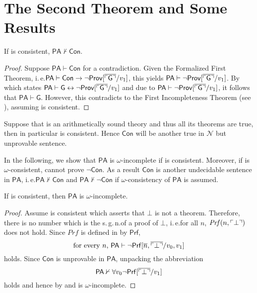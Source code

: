 \section{The Second Theorem and Some Results}

\begin{thm} \label{thm:secondPA}
If \PA is consistent, $\mathsf{PA} \nvdash \mathsf{Con}$.
\end{thm}
\begin{proof}
Suppose $\mathsf{PA} \vdash \mathsf{Con}$ for a contradiction. Given the Formalized First Theorem, i.\,e.\@ $\mathsf{PA} \vdash \mathsf{Con} \rightarrow  \lnot \mathsf{Prov}[\overline{\ulcorner \mathsf{G} \urcorner}/v_1]$, this yields $\mathsf{PA} \vdash \lnot \mathsf{Prov}[\overline{\ulcorner \mathsf{G} \urcorner}/v_1]$. By  which states $\mathsf{PA} \vdash \mathsf{G} \leftrightarrow \lnot \mathsf{Prov[\overline{\ulcorner G \urcorner}}/v_1]$ and due to $\mathsf{PA} \vdash \lnot \mathsf{Prov}[\overline{\ulcorner \mathsf{G} \urcorner}/v_1]$, it follows that $\mathsf{PA \vdash G}$. However, this contradicts to the First Incompleteness Theorem (see ), assuming \PA is consistent.
\end{proof}

Suppose that \PA is an arithmetically sound theory and thus all its theorems are true, then in particular \PA is consistent. Hence $\mathsf{Con}$ will be another true in $\mathcal{N}$ but unprovable sentence. 

In the following, we show that $\mathsf{PA}$ is $\omega$-incomplete if \PA is consistent. Moreover, if \PA is $\omega$-consistent, \PA cannot prove $\lnot \mathsf{Con}$. As a result $\mathsf{Con}$ is another undecidable sentence in $\mathsf{PA}$, i.\,e.\@ $\mathsf{PA \nvdash Con}$ and $\mathsf{PA \nvdash \lnot Con}$ if $\omega$-consistency of $\mathsf{PA}$ is assumed. 
\begin{cor} \label{cor:PAomegaincomplete}
If \PA is consistent, then $\mathsf{PA}$ is $\omega$-incomplete.
\end{cor}
\begin{proof}
Assume \PA is consistent which asserts that $\bot$ is not a theorem. Therefore, there is no number which is the s.\,g.\,n.\@ of a proof of $\bot$, i.\,e.\@ for all $n$, $\mathit{Prf}(n, \ulcorner \bot \urcorner )$ does not hold. Since $\mathit{Prf}$ is defined in \PA by $\mathsf{Prf}$, 
\begin{equation}\label{eq:omegain1}
\text{for every }n\text{, }\mathsf{PA
 \vdash \lnot Prf} [\overline{n}, \overline{\ulcorner \bot \urcorner} /v_0, v_1]
\end{equation}
holds. Since $\mathsf{Con}$ is unprovable in $\mathsf{PA}$, unpacking the abbreviation
\begin{equation}\label{eq:omegain2}
\mathsf{PA \nvdash \forall} v_0  \lnot\mathsf{ Prf}[ \overline{\ulcorner \bot \urcorner}/v_1]
\end{equation}
holds and hence by  and  \PA is $\omega$-incomplete.
\end{proof}

